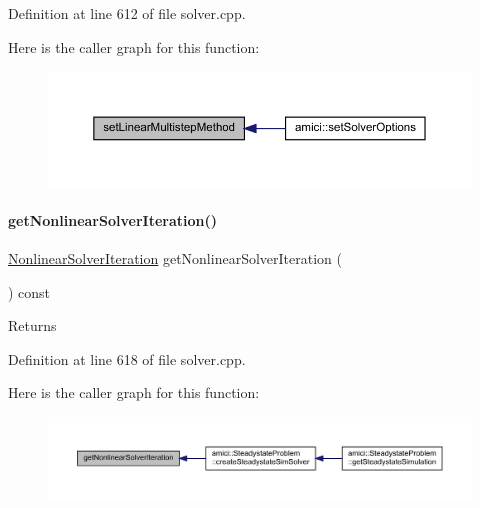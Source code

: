 Definition at line 612 of file solver.\+cpp.

Here is the caller graph for this function\+:
\nopagebreak
\begin{figure}[H]
\begin{center}
\leavevmode
\includegraphics[width=350pt]{classamici_1_1_solver_a2143a6f85b81c24611aad5689865953c_icgraph}
\end{center}
\end{figure}
\mbox{\label{classamici_1_1_solver_a33883905a8ab056896373d76f18ce683}} 
\paragraph{\texorpdfstring{get\+Nonlinear\+Solver\+Iteration()}{getNonlinearSolverIteration()}}
{\footnotesize\ttfamily \mbox{\hyperlink{namespaceamici_a13388d34e4c35bb592c3e821c35cc923}{Nonlinear\+Solver\+Iteration}} get\+Nonlinear\+Solver\+Iteration (\begin{DoxyParamCaption}{ }\end{DoxyParamCaption}) const}

\begin{DoxyReturn}{Returns}

\end{DoxyReturn}


Definition at line 618 of file solver.\+cpp.

Here is the caller graph for this function\+:
\nopagebreak
\begin{figure}[H]
\begin{center}
\leavevmode
\includegraphics[width=350pt]{classamici_1_1_solver_a33883905a8ab056896373d76f18ce683_icgraph}
\end{center}
\end{figure}
\mbox{\label{classamici_1_1_solver_a1dc7983f545ee95f7e6fb38cfb0b3286}} 
